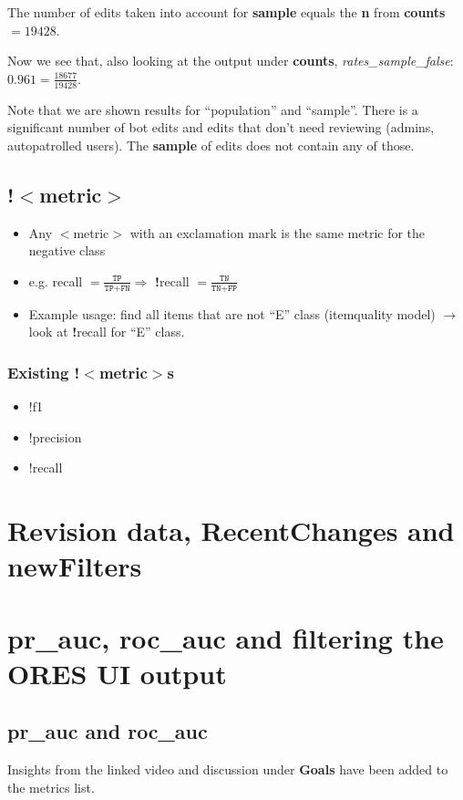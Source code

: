 \documentclass[12pt,a4paper]{article}
\begin{document}
\begin{enumerate}
\begin{description}
\item The number of edits taken into account for \textbf{sample} equals the \textbf{n} from \textbf{counts} $= 19428$.
\item Now we see that, also looking at the output under \textbf{counts}, \textit{rates\_sample\_false}: $0.961 = \frac{18677}{19428}$.
\item Note that we are shown results for ``population'' and ``sample''. There is a significant number of bot edits and edits that don't need reviewing (admins, autopatrolled users). The \textbf{sample} of edits does not contain any of those.
\end{description}
\end{enumerate}
%
\subsection{!$<$metric$>$}
\begin{itemize}
\item Any $<$metric$>$ with an exclamation mark is the same metric for the negative class
\item e.g. recall $= \frac{\texttt{TP}}{\texttt{TP} + \texttt{FN}} \Rightarrow$ \textbf{!}recall  $= \frac{\texttt{TN}}{\texttt{TN} + \texttt{FP}}$
\item Example usage: find all items that are not ``E'' class  (itemquality model) $\rightarrow$ look at \textbf{!}recall for ``E'' class.
\end{itemize}
\subsubsection{Existing !$<$metric$>$s}
\begin{itemize}
\item !f1
\item !precision
\item !recall
\end{itemize}
%
%
%
\section{Revision data, RecentChanges and newFilters}
%
%
%
\section{pr\_auc, roc\_auc and filtering the ORES UI output}
\subsection{pr\_auc and roc\_auc}
Insights from the linked video and discussion under \textbf{Goals} have been added to the metrics list.
\end{document}
